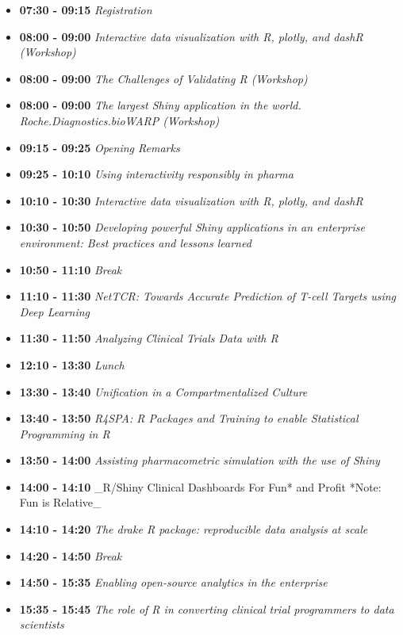\documentclass[]{book}
\providecommand{\tightlist}{%
  \setlength{\itemsep}{0pt}\setlength{\parskip}{0pt}}
\theoremstyle{definition}
\theoremstyle{definition}
\theoremstyle{definition}
\theoremstyle{remark}
\begin{document}
\begin{itemize}
\tightlist
\item
  \textbf{07:30 - 09:15} \emph{Registration}
\item
  \textbf{08:00 - 09:00} \emph{Interactive data visualization with R,
  plotly, and dashR (Workshop)}
\item
  \textbf{08:00 - 09:00} \emph{The Challenges of Validating R
  (Workshop)}
\item
  \textbf{08:00 - 09:00} \emph{The largest Shiny application in the
  world. Roche.Diagnostics.bioWARP (Workshop)}
\item
  \textbf{09:15 - 09:25} \emph{Opening Remarks}
\item
  \textbf{09:25 - 10:10} \emph{Using interactivity responsibly in
  pharma}
\item
  \textbf{10:10 - 10:30} \emph{Interactive data visualization with R,
  plotly, and dashR}
\item
  \textbf{10:30 - 10:50} \emph{Developing powerful Shiny applications in
  an enterprise environment: Best practices and lessons learned}
\item
  \textbf{10:50 - 11:10} \emph{Break}
\item
  \textbf{11:10 - 11:30} \emph{NetTCR: Towards Accurate Prediction of
  T-cell Targets using Deep Learning}
\item
  \textbf{11:30 - 11:50} \emph{Analyzing Clinical Trials Data with R}
\item
  \textbf{12:10 - 13:30} \emph{Lunch}
\item
  \textbf{13:30 - 13:40} \emph{Unification in a Compartmentalized
  Culture}
\item
  \textbf{13:40 - 13:50} \emph{R4SPA: R Packages and Training to enable
  Statistical Programming in R}
\item
  \textbf{13:50 - 14:00} \emph{Assisting pharmacometric simulation with
  the use of Shiny}
\item
  \textbf{14:00 - 14:10} \_R/Shiny Clinical Dashboards For Fun* and
  Profit *Note: Fun is Relative\_
\item
  \textbf{14:10 - 14:20} \emph{The drake R package: reproducible data
  analysis at scale}
\item
  \textbf{14:20 - 14:50} \emph{Break}
\item
  \textbf{14:50 - 15:35} \emph{Enabling open-source analytics in the
  enterprise}
\item
  \textbf{15:35 - 15:45} \emph{The role of R in converting clinical
  trial programmers to data scientists}

\end{itemize}
\end{document}

